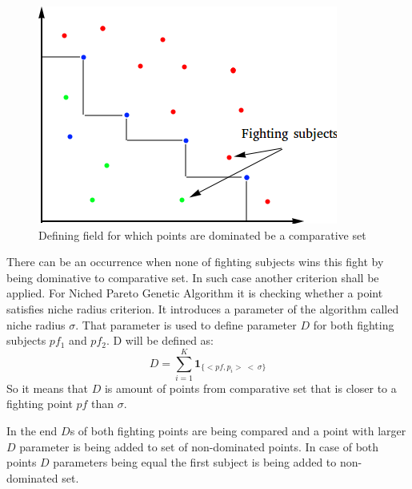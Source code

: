 \documentclass[a4paper, 11pt]{article}
\begin{document}
	\begin{figure}[H]
	\centering
	\includegraphics[scale=0.75]{comparative_set}
	\caption{Defining field for which points are dominated be a comparative set}
	\label{fig:comparative_set}
	\end{figure}
	
	There can be an occurrence when none of fighting subjects wins this fight by
	being dominative to comparative set. In such case another criterion shall be
	applied. For Niched Pareto Genetic Algorithm it is checking whether a point
	satisfies niche radius criterion.
	It introduces a parameter of the algorithm called niche radius $\sigma$.
	That parameter is used to define parameter $D$ for both fighting subjects
	$pf_{1}$ and $pf_{2}$. D will be defined as:
	$$D=\sum_{i=1}^{K}\boldsymbol{1}_{\{<pf,p_{i}>\ <\ \sigma\}}$$
	So it means that $D$ is amount of points from comparative set that is closer to
	a fighting point $pf$ than $\sigma$.
	
	In the end $D$s of both fighting points are being compared and a point with
	larger $D$ parameter is being added to set of non-dominated points.
	In case of both points $D$ parameters being equal the first subject is being
	added to non-dominated set.
	
\end{document}
